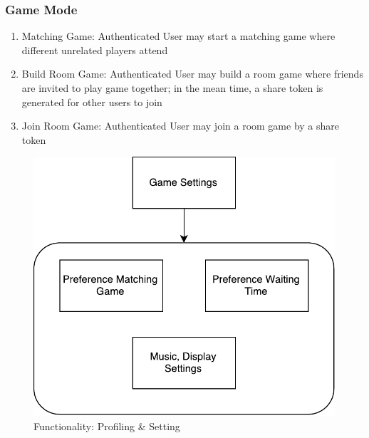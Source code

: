 \documentclass[11pt]{article}
\begin{document}
\subsubsection{Game Mode}
\begin{enumerate}
\item
Matching Game: Authenticated User may start a matching game where different unrelated players attend
\item
Build Room Game: Authenticated User may build a room game where friends are invited to play game together; in the mean time, a share token is generated for other users to join
\item
Join Room Game: Authenticated User may join a room game by a share token
\end{enumerate}

\begin{figure}
\centering
\begin{minipage}{.5\linewidth}
\centering
\includegraphics[width=.9\linewidth]{func-settings.pdf}
\caption{Functionality: Profiling \& Setting}
\label{fig:func-settings}
\end{minipage}%
\begin{minipage}{.5\linewidth}
\centering

\end{minipage}
\end{figure}
\end{document}

